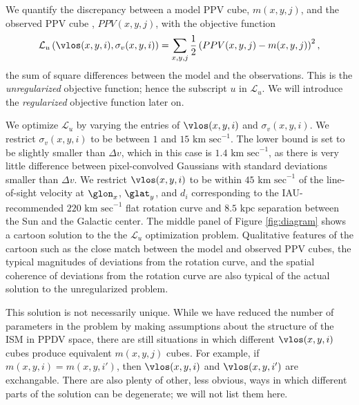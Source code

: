 We quantify the discrepancy between a model PPV cube, $m(x, y, j)$, and the observed PPV cube , $PPV(x, y, j)$, with the objective function
\begin{equation}
  \label{eqn:obj_unreg}
  \mathcal{L}_u \left(\vlos(x, y, i), \sigma_v(x, y, i) \right) = 
  \sum_{x, y, j} \frac{1}{2} \left(PPV(x, y, j) -  m(x, y, j)\right)^2,
\end{equation}
the sum of square differences between the model and the observations. 
This is the \emph{unregularized} objective function; hence the subscript $u$ in $\mathcal{L}_u$.
We will introduce the \emph{regularized} objective function later on. 

We optimize $\mathcal{L}_u$ by varying the entries of $\vlos(x, y, i)$ and $\sigma_v(x, y, i)$. 
We restrict $\sigma_v(x, y, i)$ to be between $1$ and $15\text{ km sec}^{-1}$. 
The lower bound is set to be slightly smaller than $\Delta v$, which in this case is $1.4 \text{ km sec}^{-1}$, as there is very little difference between pixel-convolved Gaussians with standard deviations smaller than $\Delta v$. 
We restrict $\vlos(x, y, i)$ to be within $45 \text{ km sec}^{-1}$ of the line-of-sight velocity at $\glon_x$, $\glat_y$, and $d_i$ corresponding to the IAU-recommended $220 \text{ km sec}^{-1}$ flat rotation curve and $8.5 \text{ kpc}$ separation between the Sun and the Galactic center.
The middle panel of Figure \ref{fig:diagram} shows a cartoon solution to the the $\mathcal{L}_u$ optimization problem. 
Qualitative features of the cartoon such as the close match between the model and observed PPV cubes, the typical magnitudes of deviations from the rotation curve, and the spatial coherence of deviations from the rotation curve are also typical of the actual solution to the unregularized problem.

This solution is not necessarily unique. 
While we have reduced the number of parameters in the problem by making assumptions about the structure of the ISM in PPDV space, there are still situations in which different $\vlos(x, y, i)$ cubes produce equivalent $m(x, y, j)$ cubes. 
For example, if $m(x, y, i) = m(x, y, i')$, then $\vlos(x, y, i)$ and $\vlos(x, y, i')$ are exchangable.
There are also plenty of other, less obvious, ways in which different parts of the solution can be degenerate; we will not list them here.

